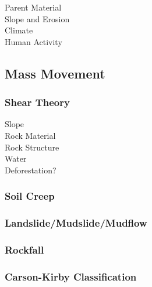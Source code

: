 \documentclass[../../main]{subfiles}
\begin{document}
	\begin{description}
		\item[Parent Material]
		\item[Slope and Erosion]
		\item[Climate]
		\item[Human Activity]
	\end{description}

\subsection{Mass Movement}

	\subsubsection{Shear Theory}

	\begin{description}
		\item[Slope]
		\item[Rock Material]
		\item[Rock Structure]
		\item[Water]
		\item[Deforestation?]
	\end{description}

	\subsubsection{Soil Creep}

	\subsubsection{Landslide/Mudslide/Mudflow}

	\subsubsection{Rockfall}

	\subsubsection{Carson-Kirby Classification}
\end{document}
